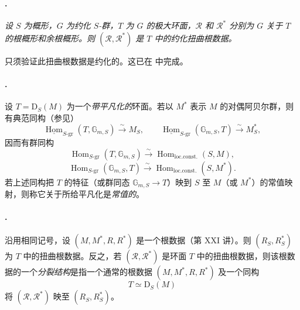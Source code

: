 \paragraph{.}
\textit{设 \(S\) 为概形，\(G\) 为约化 \(S\)-群，\(T\) 为 \(G\) 的极大环面，\(\mathcal R\) 和 \(\mathcal R^*\) 分别为 \(G\) 关于 \(T\) 的根概形和余根概形。则 \((\mathcal R,\mathcal R^*)\) 是 \(T\) 中的约化扭曲根数据。}

只须验证此扭曲根数据是约化的。这已在 中完成。

\paragraph{.}
设 \(T=\mathrm D_S(M)\) 为一个\emph{带平凡化的}环面。若以 \(M^*\) 表示 \(M\) 的对偶阿贝尔群，则有典范同构（参见）
\[
  \underline{\operatorname{Hom}}_{S\text{-gr}}
    (T,\mathbb G_{m,S})
  \xrightarrow{\sim} M_S,
  \qquad
  \underline{\operatorname{Hom}}_{S\text{-gr}}
    (\mathbb G_{m,S},T)
  \xrightarrow{\sim} M^*_S,
\]
因而有群同构
\[
  \operatorname{Hom}_{S\text{-gr}}(T,\mathbb G_{m,S})
  \xrightarrow{\sim}
  \operatorname{Hom}_{\mathrm{loc.const.}}(S,M),
\]
\[
  \operatorname{Hom}_{S\text{-gr}}(\mathbb G_{m,S},T)
  \xrightarrow{\sim}
  \operatorname{Hom}_{\mathrm{loc.const.}}(S,M^*).
\]
若上述同构把 \(T\) 的特征（或群同态 \(\mathbb G_{m,S}\to T\)）映到 \(S\) 至 \(M\)（或 \(M^*\)）的常值映射，则称它关于所给平凡化是\emph{常值的}。

\paragraph{.}
沿用相同记号，设 \((M,M^*,R,R^*)\) 是一个根数据（第 XXI 讲）。则 \((R_S,R^*_S)\) 为 \(T\) 中的扭曲根数据。反之，若 \((\mathcal R,\mathcal R^*)\) 是环面 \(T\) 中的扭曲根数据，则该根数据的一个\emph{分裂结构}是指一个通常的根数据 \((M,M^*,R,R^*)\) 及一个同构
\[
  T\simeq\mathrm D_S(M)
\]
将 \((\mathcal R,\mathcal R^*)\) 映至 \((R_S,R^*_S)\)。

